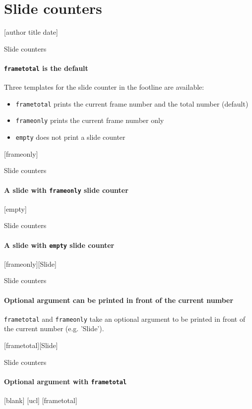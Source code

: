 \documentclass{beamer}
\begin{document}

\section{Slide counters}

[author title date]

\begin{frame}{Slide counters}
  \framesubtitle{\texttt{frametotal} is the default}
  Three templates for the slide counter in the footline are available:
  \begin{itemize}
    \item \texttt{frametotal} prints the current frame number and the total number (default)
    \item \texttt{frameonly} prints the current frame number only
    \item \texttt{empty} does not print a slide counter
  \end{itemize}
\end{frame}

[frameonly]
\begin{frame}{Slide counters}
  \framesubtitle{A slide with \texttt{frameonly} slide counter}
\end{frame}

[empty]
\begin{frame}{Slide counters}
  \framesubtitle{A slide with \texttt{empty} slide counter}
\end{frame}

[frameonly][Slide]
\begin{frame}{Slide counters}
  \framesubtitle{Optional argument can be printed in front of the current number}
  \texttt{frametotal} and \texttt{frameonly} take an optional argument
  to be printed in front of the current number (e.g. 'Slide').
\end{frame}

[frametotal][Slide]
\begin{frame}{Slide counters}
  \framesubtitle{Optional argument with \texttt{frametotal}}
\end{frame}

[blank]
[ucl]
[frametotal]

\end{document}
